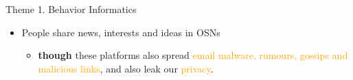 \documentclass[
 size=14pt,
 paper=smartboard,  %
 mode=present, 		%
 display=slides, 	%
 pauseslide,
 fleqn,leqno]{powerdot}{}
\begin{document}
\begin{slide}{Theme 1. Behavior Informatics}
\begin{itemize}
\item
People share \textcolor{blue!50}{news, interests}
and \textcolor{blue!50}{ideas} in OSNs

\begin{itemize}
\item
\textbf{though} these platforms also spread
\textcolor{orange}{email malware, rumours, gossips}
\textcolor{orange}{and malicious links}, and also leak our
\textcolor{orange}{privacy}.
\end{itemize}
\end{itemize}

\end{slide}
\end{document}
